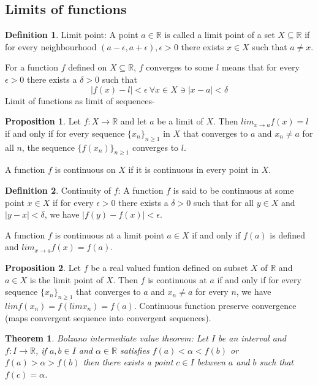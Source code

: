 \documentclass[12pt]{report}
\newtheorem{thm}{Theorem}
\theoremstyle{definition}
\newtheorem{defn}{Definition}
\newtheorem{prop}{Proposition}
\begin{document}
\subsection*{Limits of functions}
\begin{defn}
    Limit point: A point $a \in \mathbb{R}$ is called a limit point of a set $X \subseteq \mathbb{R}$ if for every neighbourhood $(a - \epsilon, a+ \epsilon), \epsilon>0$ there exists $x \in X$ such that $a \neq x$.  
\end{defn}
For a function $f$ defined on $X \subseteq \mathbb{R}$, $f$ converges to some $l$ means that for every $\epsilon > 0$ there exists a $\delta > 0$ such that
$$ |f(x) - l| < \epsilon ~\forall x \in X \ni |x - a| < \delta$$ 
Limit of functions as limit of sequences-
\begin{prop}
    Let $f:X\to \mathbb{R}$ and let $a$ be a limit of $X$. Then $lim_{x \to a} f(x) = l$ if and only if for every sequence $\{x_n\}_{n \geq 1}$ in $X$ that converges to $a$ and $x_n \neq a$ for all $n$, the sequence $\{f(x_n)\}_{n \geq 1}$ converges to $l$. 
\end{prop}
A function $f$ is continuous on $X$ if it is continuous in every point in $X$.
\begin{defn}
    Continuity of $f$: A function $f$ is said to be continuous at some point $x \in X$ if for every $\epsilon > 0$ there exists a $\delta > 0$ such that for all $y \in X$ and $|y - x| < \delta$, we have $|f(y) - f(x)| < \epsilon$.
\end{defn}
A function $f$ is continuous at a limit point $a \in X$ if and only if $f(a)$ is defined and $ lim_{x \to a} f(x) = f(a)$.
\begin{prop}
    Let $f$ be a real valued funtion defined on subset $X$ of $\mathbb{R}$ and $a \in X$ is the limit point of $X$. Then $f$ is continuous at $a$ if and only if for every sequence $\{x_n\}_{n \geq 1}$ that converges to $a$ and $x_n \neq a$ for every $n$, we have $lim f(x_n) = f(lim x_n) = f(a)$. Continuous function preserve convergence (maps convergent sequence into convergent sequences).  
\end{prop}
\begin{thm}
    Bolzano intermediate value theorem: Let $I$ be an interval and $f: I \to \mathbb{R}$, if $a,b \in I$ and $\alpha \in \mathbb{R}$ satisfies $f(a) < \alpha < f(b)$ or $f(a) > \alpha > f(b)$ then there exists a point $c \in I$ between $a$ and $b$ such that $f(c) = \alpha$.
\end{thm}
\end{document}
